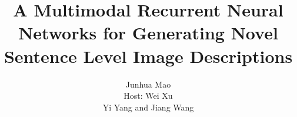 \documentclass{article} %
\title{A Multimodal Recurrent Neural Networks for Generating Novel Sentence Level Image Descriptions}
\author{
Junhua Mao\\
Host: Wei Xu\\
Yi Yang and Jiang Wang
}
\begin{document}
\maketitle








{\small


}
\end{document}
